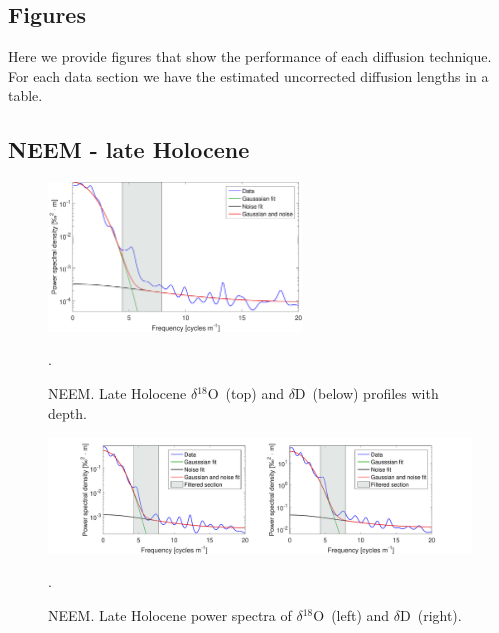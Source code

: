 \documentclass[11pt, draftcls, onecolumn]{IEEEtran} %
\numberwithin{equation}{section}
\numberwithin{table}{section}
\numberwithin{figure}{section}
\newcommand{\delOx}{$\delta{}^{18}\mathrm{O}$}
\newcommand{\delD}{$\delta\mathrm{D}$}
\begin{document}
\begin{appendices}
\clearpage
\section{Figures} \label{sec:appendix_spectra_figures}
Here we provide figures that show the performance of each diffusion technique. 
For each data section we have the estimated uncorrected diffusion lengths in a table.
\subsection{NEEM - late Holocene}

\begin{figure}[H]
	\vspace*{2mm}
	\begin{center}
		\includegraphics[width=0.6\textwidth]{Figure_18}
		\caption{NEEM. Late Holocene \delOx~(top) and \delD~(below) profiles with depth.}  \label{fig:NEEM_late_holo}.
	\end{center}
\end{figure}


\begin{figure}[H]
	\vspace*{2mm}
	\begin{center}
		\includegraphics[width=1\textwidth]{Figure_19}
		\caption{NEEM. Late Holocene power spectra of \delOx~(left) and \delD~(right).}  \label{fig:NEEM_late_fig_1}.
	\end{center}
\end{figure}


\end{appendices}
\end{document}
